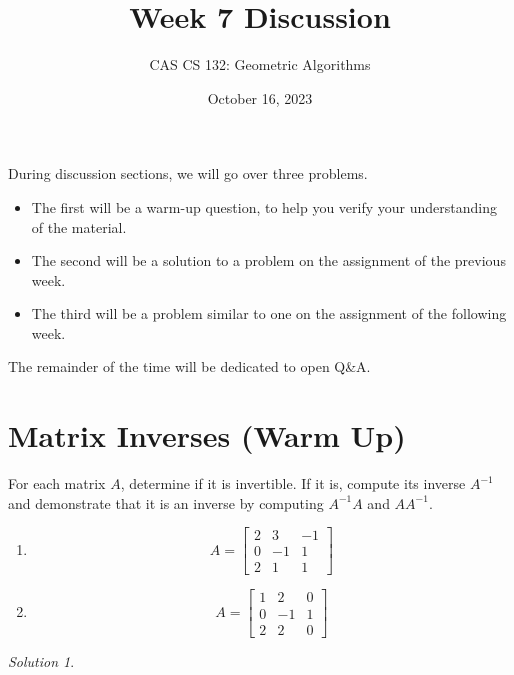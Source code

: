 \documentclass{article}
\title{
  Week 7 Discussion
}
\author{CAS CS 132: Geometric Algorithms}
\date{October 16, 2023}
\theoremstyle{remark}
\newtheorem*{solution}{Solution}
\begin{document}
\maketitle

\noindent During discussion sections, we will go over three problems.
\begin{itemize}
\item The first will be a warm-up question, to help you verify your understanding of the material.
\item The second will be a solution to a problem on the assignment of the previous week.
\item The third will be a problem similar to one on the assignment of the following week.
\end{itemize}
The remainder of the time will be dedicated to open Q\&A.

\pagebreak
\section{Matrix Inverses (Warm Up)}
For each matrix $A$, determine if it is invertible. If it is, compute its inverse $A^{-1}$ and demonstrate that it is an inverse by computing $A^{-1}A$ and $AA^{-1}$.

\begin{enumerate}
\item
  \begin{displaymath}
    A =
    \begin{bmatrix}
      2 & 3 & -1 \\
      0 & -1 & 1 \\
      2 & 1 & 1
    \end{bmatrix}
  \end{displaymath}
\item
  \begin{displaymath}
    A =
    \begin{bmatrix}
      1 & 2 & 0 \\
      0 & -1 & 1 \\
      2 & 2 & 0
    \end{bmatrix}
  \end{displaymath}
\end{enumerate}

\begin{solution}
\end{solution}

\pagebreak
\end{document}
